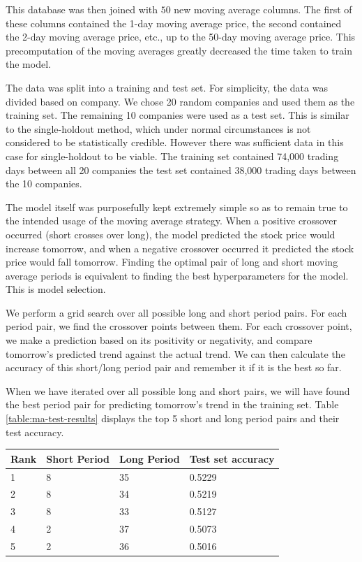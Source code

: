 \documentclass{report}
\begin{document}
This database was then joined with $50$ new moving average columns. The first of these columns contained the 1-day moving average price, the second contained the 2-day moving average price, etc., up to the 50-day moving average price. This precomputation of the moving averages greatly decreased the time taken to train the model.

The data was split into a training and test set. For simplicity, the data was divided based on company. We chose 20 random companies and used them as the training set. The remaining 10 companies were used as a test set. This is similar to the single-holdout method, which under normal circumstances is not considered to be statistically credible. However there was sufficient data in this case for single-holdout to be viable. The training set contained 74,000 trading days between all 20 companies the test set contained 38,000 trading days between the 10 companies.

The model itself was purposefully kept extremely simple so as to remain true to the intended usage of the moving average strategy. When a positive crossover occurred (short crosses over long), the model predicted the stock price would increase tomorrow, and when a negative crossover occurred it predicted the stock price would fall tomorrow. Finding the optimal pair of long and short moving average periods is equivalent to finding the best hyperparameters for the model. This is model selection.

We perform a grid search over all possible long and short period pairs. For each period pair, we find the crossover points between them. For each crossover point, we make a prediction based on its positivity or negativity, and compare tomorrow's predicted trend against the actual trend. We can then calculate the accuracy of this short/long period pair and remember it if it is the best so far.

When we have iterated over all possible long and short pairs, we will have found the best period pair for predicting tomorrow's trend in the training set. Table \ref{table:ma-test-results} displays the top 5 short and long period pairs and their test accuracy.


\begin{center}
    \begin{tabular}{l | l | l | l}
    Rank & Short Period & Long Period & Test set accuracy \\ \hline
    1 & 8 & 35 & 0.5229 \\ \hline
    2 & 8 & 34 & 0.5219 \\ \hline
    3 & 8 & 33 & 0.5127 \\ \hline
    4 & 2 & 37 & 0.5073 \\ \hline
    5 & 2 & 36 & 0.5016 
    \label{table:ma-test-results}
    \end{tabular}
\end{center}
\end{document}

